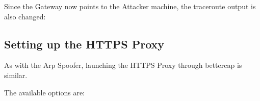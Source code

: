 \newpage

Since the Gateway now points to the Attacker machine, the traceroute output is also changed:

\begin{figure}[!hb]
 \centering
 \vspace{0.5cm}
\end{figure}


\subsection{Setting up the HTTPS Proxy}

As with the Arp Spoofer, launching the HTTPS Proxy through bettercap is similar.

The available options are:

